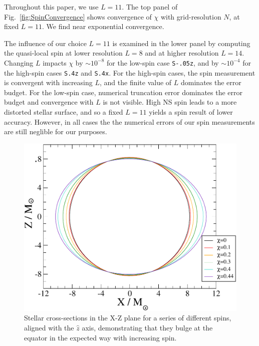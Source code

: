 {Throughout this paper, we use $L=11$.  The top panel of
Fig.~\ref{fig:SpinConvergence} shows convergence of $\chi$ with
grid-resolution $N$, at fixed $L=11$.  We find near exponential
convergence.

The influence of our choice $L=11$ is examined in the lower panel by
computing the quasi-local spin at lower resolution $L=8$ and at higher
resolution $L=14$.  Changing $L$ impacts $\chi$ by $\sim 10^{-8}$ for
the low-spin case {\tt S-.05z}, and by $\sim 10^{-4}$ for the high-spin
cases {\tt S.4z} and {\tt S.4x}.  For the high-spin cases, the spin
  measurement is convergent with increasing $L$, and the finite value
  of $L$ dominates the error budget.  For the low-spin case, numerical
  truncation error dominates the error budget and convergence with $L$
  is not visible.  High NS spin leads to a more distorted stellar
  surface, and so a fixed $L=11$ yields a spin result of lower
  accuracy.  However, in all cases the the numerical errors of our
  spin measurements are still neglible for our purposes.

\begin{figure}
\includegraphics[width=0.98\columnwidth]{chap2/Bulging}
\caption[Stellar cross-section for a series of different spins.]{{\label{fig:Bulging}}Stellar cross-sections in the X-Z plane for a
  series of different spins, aligned with the $\hat{z}$ axis,
  demonstrating that they bulge at the equator in the expected way
  with increasing spin.}
\end{figure}


}
